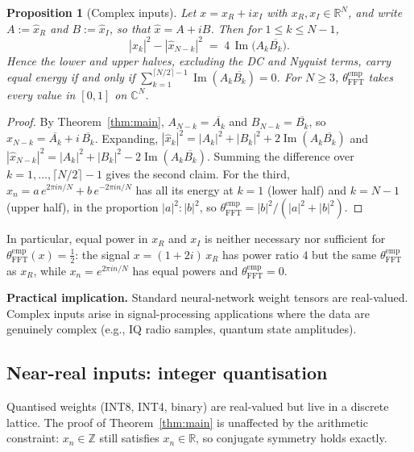 \documentclass[12pt]{article}
\newtheorem{proposition}[theorem]{Proposition}
\theoremstyle{definition}
\newcommand{\Z}{\mathbb{Z}}
\newcommand{\R}{\mathbb{R}}
\newcommand{\C}{\mathbb{C}}
\newcommand{\abs}[1]{\left|#1\right|}
\newcommand{\thetaFFT}{\theta_{\mathrm{FFT}}}
\begin{document}
\begin{proposition}[Complex inputs]\label{prop:complex}
Let $x = x_R + i x_I$ with $x_R, x_I \in \R^N$, and write
$A := \hat{x}_R$ and $B := \hat{x}_I$, so that $\hat{x} = A + iB$.  Then
for $1 \leq k \leq N-1$,
\[
  \abs{\hat{x}_k}^2 - \abs{\hat{x}_{N-k}}^2
  \;=\; 4 \, \operatorname{Im}\bigl(A_k \overline{B_k}\bigr).
\]
Hence the lower and upper halves, excluding the DC and Nyquist terms,
carry equal energy if and only if
$\sum_{k=1}^{\lceil N/2 \rceil - 1} \operatorname{Im}(A_k \overline{B_k}) = 0$.
For $N \geq 3$, $\thetaFFT^{\mathrm{emp}}$ takes every value in $[0,1]$
on $\C^N$.
\end{proposition}

\begin{proof}
By Theorem~\ref{thm:main}, $A_{N-k} = \overline{A_k}$ and
$B_{N-k} = \overline{B_k}$, so
$\hat{x}_{N-k} = \overline{A_k} + i\,\overline{B_k}$.  Expanding,
$\abs{\hat{x}_k}^2 = \abs{A_k}^2 + \abs{B_k}^2 + 2\operatorname{Im}(A_k \overline{B_k})$
and
$\abs{\hat{x}_{N-k}}^2 = \abs{A_k}^2 + \abs{B_k}^2 - 2\operatorname{Im}(A_k \overline{B_k})$.
Summing the difference over $k = 1, \ldots, \lceil N/2 \rceil - 1$ gives
the second claim.  For the third, $x_n = a\,e^{2\pi i n/N} + b\,e^{-2\pi i n/N}$
has all its energy at $k = 1$ (lower half) and $k = N-1$ (upper half),
in the proportion $\abs{a}^2 : \abs{b}^2$, so
$\thetaFFT^{\mathrm{emp}} = \abs{b}^2/(\abs{a}^2 + \abs{b}^2)$.
\end{proof}

In particular, equal power in $x_R$ and $x_I$ is neither necessary nor
sufficient for $\thetaFFT^{\mathrm{emp}}(x) = \tfrac{1}{2}$: the signal
$x = (1+2i)\,x_R$ has power ratio $4$ but the same
$\thetaFFT^{\mathrm{emp}}$ as $x_R$, while $x_n = e^{2\pi i n/N}$ has
equal powers and $\thetaFFT^{\mathrm{emp}} = 0$.

\textbf{Practical implication.}  Standard neural-network weight tensors
are real-valued.  Complex inputs arise in signal-processing applications
where the data are genuinely complex (e.g., IQ radio samples, quantum
state amplitudes).

\subsection{Near-real inputs: integer quantisation}

Quantised weights (INT8, INT4, binary) are real-valued but live in a
discrete lattice.  The proof of Theorem~\ref{thm:main} is unaffected
by the arithmetic constraint: $x_n \in \Z$ still satisfies $x_n \in \R$,
so conjugate symmetry holds exactly.
\end{document}
